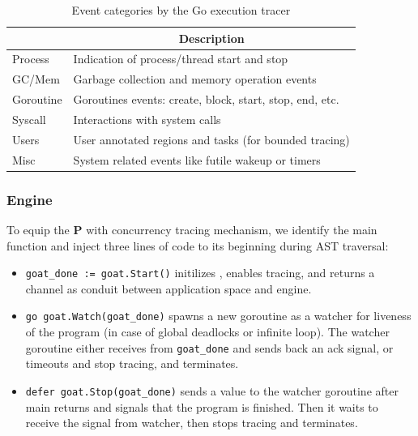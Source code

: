 \begin{table}[]
    \centering
        \begin{tabular}{|l|l|}
        \hline
        \rowcolor[HTML]{C0C0C0}
        \multicolumn{1}{|c|}{\cellcolor[HTML]{C0C0C0}\textbf{Category}} & \multicolumn{1}{c|}{\cellcolor[HTML]{C0C0C0}\textbf{Description}} \\ \hline
        Process & Indication of process/thread start and stop \\ \hline
        GC/Mem & Garbage collection and memory operation events\\ \hline
        Goroutine & Goroutines events: create, block, start, stop, end, etc. \\ \hline
        Syscall & Interactions with system calls \\ \hline
        Users & User annotated regions and tasks (for bounded tracing) \\ \hline
        Misc & System related events like futile wakeup or timers \\ \hline
        \end{tabular}

    \caption{Event categories by the Go execution tracer}
    \label{tab:events}
\end{table}

\subsubsection{\goat Engine}
To equip the \textbf{P} with concurrency tracing mechanism, we identify the main function and inject three lines of code to its beginning during AST traversal:
\begin{itemize}
  \item \texttt{goat\_done := goat.Start()} initilizes \goat, enables tracing, and returns a channel as conduit between application space and \goat engine.
  \item \texttt{go goat.Watch(goat\_done)} spawns a new goroutine as a watcher for liveness of the program (in case of global deadlocks or infinite loop). The watcher goroutine either receives from \texttt{goat\_done} and sends back an ack signal, or timeouts and stop tracing, and terminates.
  \item \texttt{defer goat.Stop(goat\_done)} sends a value to the watcher goroutine after main returns and signals that the program is finished. Then it waits to receive the signal from watcher, then stops tracing and terminates.
\end{itemize}

